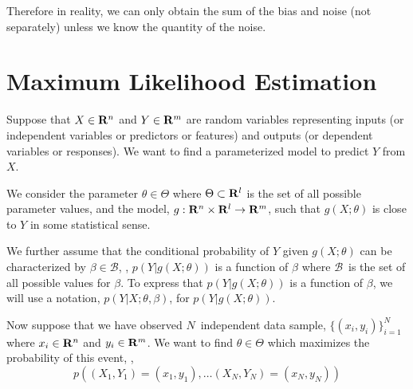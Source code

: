 Therefore in reality, we can only obtain the sum of the bias and noise (not separately)
unless we know the quantity of the noise.


\newcommand{\numsamples}{\ensuremath{N}}
\newcommand{\sequence}[3]{\ensuremath{\{#1\}_{{#2}=1}^{#3}}}

\newcommand{\noise}{\ensuremath{\beta}}
\newcommand{\noiseset}{\ensuremath{\mathcal{B}}}

\newcommand{\prior}{\ensuremath{\alpha}}
\newcommand{\priorset}{\ensuremath{\mathcal{A}}}

\newcommand{\param}{\ensuremath{\theta}}
\newcommand{\paramset}{\Theta}
\newcommand{\paramdim}{l}

\newcommand{\bigX}{\tilde{X}}
\newcommand{\bigY}{\tilde{Y}}
\newcommand{\bigx}{\ensuremath{\tilde{x}}}
\newcommand{\bigy}{\ensuremath{\tilde{y}}}

\newcommand{\mles}[1]{{#1}_\mathrm{ML}}
\newcommand{\maps}[1]{{#1}_\mathrm{MAP}}

\section{Maximum Likelihood Estimation}

Suppose that $X \in\mathbf{R}^n$ and $Y \in\mathbf{R}^m$ are random variables
representing inputs (or independent variables or predictors or features)
and outputs (or dependent variables or responses).
We want to find a parameterized model to predict $Y$ from $X$.

We consider the parameter $\param\in\paramset$
where $\paramset\subset \reals^\paramdim$ is the set of all possible parameter values,
and the model, $g: \reals^n \times \reals^\paramdim \to \reals^m$, such that
$g(X; \param)$ is close to $Y$
in some statistical sense.

We further assume that the conditional probability of $Y$ given $g(X; \param)$ can be characterized by $\noise\in\noiseset$,
\ie, $p(Y|g(X;\param))$ is a function of $\noise$
where \noiseset\ is the set of all possible values for $\noise$.
To express that $p(Y|g(X;\param))$ is a function of $\noise$,
we will use a notation, $p(Y|X;\param, \noise)$, for $p(Y|g(X;\param))$.

Now suppose that we have observed \numsamples\ independent data sample, \sequence{(x_i, y_i)}{i}{\numsamples}
where $x_i\in\mathbf{R}^n$ and $y_i\in\mathbf{R}^m$.
We want to find $\param\in\paramset$ which maximizes the probability of this event,
\ie,
\begin{equation}
\label{eq:fuxy}
p\left((X_1, Y_1)=(x_1, y_1), \ldots (X_\numsamples, Y_\numsamples)=(x_\numsamples, y_\numsamples)\right)
\end{equation}

